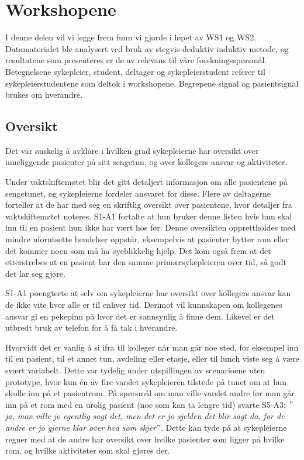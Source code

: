 \section{Workshopene}
\label{ws}
I denne delen vil vi legge frem funn vi gjorde i løpet av WS1 og WS2. Datamaterialet ble analysert ved bruk av stegvis-deduktiv induktiv metode, og resultatene som presenteres er de av relevans til våre forskningsspørsmål. Betegnelsene sykepleier, student, deltager og sykepleierstudent referer til sykepleierstudentene som deltok i workshopene. Begrepene signal og pasientsignal brukes om hverandre.

\subsection{Oversikt}
Det var ønskelig å avklare i hvilken grad sykepleierne har oversikt over inneliggende pasienter på sitt sengetun, og over kollegers ansvar og aktiviteter.

\noindent
Under vaktskiftemøtet blir det gitt detaljert informasjon om alle pasientene på sengetunet, og sykepleierne fordeler ansvaret for disse. Flere av deltagerne forteller at de har med seg en skriftlig oversikt over pasientene, hvor detaljer fra vaktskiftemøtet noteres. S1-A1 fortalte at hun bruker denne listen hvis hun skal inn til en pasient hun ikke har vært hos før. Denne oversikten opprettholdes med mindre uforutsette hendelser oppstår, eksempelvis at pasienter bytter rom eller det kommer noen som må ha øyeblikkelig hjelp. Det kom også frem at det etterstrebes at en pasient har den samme primærsykepleieren over tid, så godt det lar seg gjøre.

\noindent
S1-A1 poengterte at selv om sykepleierne har oversikt over kollegers ansvar kan de ikke vite hvor alle er til enhver tid. Derimot vil kunnskapen om kollegenes ansvar gi en pekepinn på hvor det er sannsynlig å finne dem. Likevel er det utbredt bruk av telefon for å få tak i hverandre. 

\noindent
Hvorvidt det er vanlig å si ifra til kolleger når man går noe sted, for eksempel inn til en pasient, til et annet tun, avdeling eller etasje, eller til lunch viste seg å være svært variabelt. Dette var tydelig under utspillingen av scenarioene uten prototype, hvor kun én av fire varslet sykepleieren tilstede på tunet om at hun skulle inn på et pasientrom. På spørsmål om man ville varslet andre før man går inn på et rom med en urolig pasient (noe som kan ta lengre tid) svarte S5-A3: \emph{$"$ja, man ville jo egentlig sagt det, men det er jo sjelden det blir sagt da, for de andre er jo gjerne klar over hva som skjer$"$}. Dette kan tyde på at sykepleierne regner med at de andre har oversikt over hvilke pasienter som ligger på hvilke rom, og hvilke aktiviteter som skal gjøres der.

